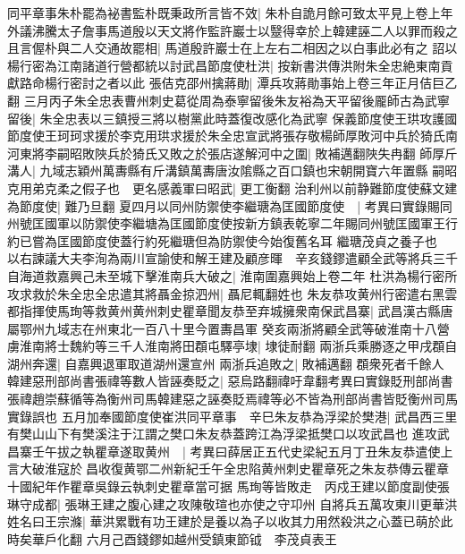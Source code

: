 同平章事朱朴罷為袐書監朴既秉政所言皆不效|{
	朱朴自詭月餘可致太平見上卷上年}
外議沸騰太子詹事馬道殷以天文將作監許巖士以毉得幸於上韓建誣二人以罪而殺之且言偓朴與二人交通故罷相|{
	馬道殷許巖士在上左右二相因之以白事此必有之}
詔以楊行密為江南諸道行營都統以討武昌節度使杜洪|{
	按新書洪傳洪附朱全忠絶東南貢獻路命楊行密討之者以此}
張佶克邵州擒蔣勛|{
	潭兵攻蔣勛事始上卷三年正月佶巨乙翻}
三月丙子朱全忠表曹州刺史葛從周為泰寧留後朱友裕為天平留後龎師古為武寧留後|{
	朱全忠表以三鎮授三將以樹黨此時蓋復改感化為武寧}
保義節度使王珙攻護國節度使王珂珂求援於李克用珙求援於朱全忠宣武將張存敬楊師厚敗河中兵於猗氏南河東將李嗣昭敗陜兵於猗氏又敗之於張店遂解河中之圍|{
	敗補邁翻陜失冉翻}
師厚斤溝人|{
	九域志穎州萬夀縣有斤溝鎮萬夀唐汝隂縣之百口鎮也宋朝開寶六年置縣}
嗣昭克用弟克柔之假子也　更名感義軍曰昭武|{
	更工衡翻}
治利州以前静難節度使蘇文建為節度使|{
	難乃旦翻}
夏四月以同州防禦使李繼瑭為匡國節度使　|{
	考異曰實錄賜同州號匡國軍以防禦使李繼塘為匡國節度使按新方鎮表乾寧二年賜同州號匡國軍王行約已嘗為匡國節度使蓋行約死繼瑭但為防禦使今始復舊名耳}
繼瑭茂貞之養子也　以右諫議大夫李洵為兩川宣諭使和解王建及顧彦暉　辛亥錢鏐遣顧全武等將兵三千自海道救嘉興己未至城下擊淮南兵大破之|{
	淮南圍嘉興始上卷二年}
杜洪為楊行密所攻求救於朱全忠全忠遣其將聶金掠泗州|{
	聶尼輒翻姓也}
朱友恭攻黄州行密遣右黑雲都指揮使馬珣等救黄州黄州刺史瞿章聞友恭至弃城擁衆南保武昌寨|{
	武昌漢古縣唐屬鄂州九域志在州東北一百八十里今置夀昌軍}
癸亥兩浙將顧全武等破淮南十八營虜淮南將士魏約等三千人淮南將田頵屯驛亭埭|{
	埭徒耐翻}
兩浙兵乘勝逐之甲戌頵自湖州奔還|{
	自嘉興退軍取道湖州還宣州}
兩浙兵追敗之|{
	敗補邁翻}
頵衆死者千餘人　韓建惡刑部尚書張禕等數人皆誣奏貶之|{
	惡烏路翻禕吁韋翻考異曰實錄貶刑部尚書張禕趙崇蘇循等為衡州司馬韓建惡之誣奏貶焉禕等必不皆為刑部尚書皆貶衡州司馬實錄誤也}
五月加奉國節度使崔洪同平章事　辛巳朱友恭為浮梁於樊港|{
	武昌西三里有樊山山下有樊溪注于江謂之樊口朱友恭蓋跨江為浮梁抵樊口以攻武昌也}
進攻武昌寨壬午拔之執瞿章遂取黄州　|{
	考異曰薛居正五代史梁紀五月丁丑朱友恭遣使上言大破淮寇於昌收復黄鄂二州新紀壬午全忠陷黄州刺史瞿章死之朱友恭傳云瞿章十國紀年作瞿章吳錄云執刺史瞿章當可据}
馬珣等皆敗走　丙戍王建以節度副使張琳守成都|{
	張琳王建之腹心建之攻陳敬瑄也亦使之守卭州}
自將兵五萬攻東川更華洪姓名曰王宗滌|{
	華洪累戰有功王建於是養以為子以收其力用然殺洪之心蓋已萌於此時矣華戶化翻}
六月己酉錢鏐如越州受鎮東節钺　李茂貞表王

